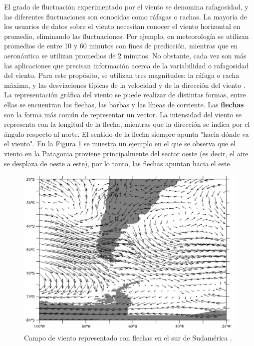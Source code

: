 El grado de fluctuación experimentado por el viento se denomina  rafagosidad, y las diferentes fluctuaciones son conocidas como ráfagas o rachas. La mayoría de los usuarios de datos sobre el viento necesitan conocer el viento horizontal en promedio, eliminando las fluctuaciones. Por ejemplo, en meteorología se utilizan promedios de entre 10 y 60 minutos con fines de predicción, mientras que en aeronáutica se utilizan promedios de 2 minutos. No obstante, cada vez son más las aplicaciones que precisan información acerca de la variabilidad o rafagosidad del viento. Para este propósito, se utilizan tres magnitudes: la ráfaga o racha máxima, y las desviaciones típicas de la velocidad y de la dirección del viento \cite{wmoChapter8}. La representación gráfica del viento se puede realizar de distintas formas, entre ellas se encuentran las flechas, las barbas y las líneas de corriente. Las \textbf{flechas} \cite{CursoDeObsevadores} son la forma más común de representar un vector. La intensidad del viento se representa con la longitud de la flecha, mientras que la dirección se indica por el ángulo respecto al norte. El sentido de la flecha siempre apunta "hacia dónde va el viento". En la Figura \ref{fig:mapaFlechas} se muestra un ejemplo en el que se observa que el viento en la Patagonia proviene principalmente del sector oeste (es decir, el aire se desplaza de oeste a este), por lo tanto, las flechas apuntan hacia el este.

\begin{figure}[H]
    \centering
    \includegraphics[width=0.85\linewidth]{Figuras/viento/mapaFlechas.png}
    \caption{Campo de viento representado con flechas en el sur de Sudamérica \cite{cursoObservadores2024}. }
    \label{fig:mapaFlechas}
\end{figure}

